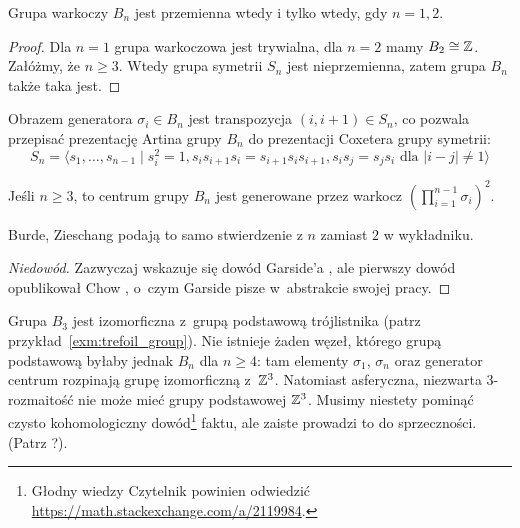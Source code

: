 \begin{proposition}
    Grupa warkoczy $B_n$ jest przemienna wtedy i tylko wtedy, gdy $n = 1, 2$.
\end{proposition}

\begin{proof}
    Dla $n = 1$ grupa warkoczowa jest trywialna, dla $n = 2$ mamy $B_2 \cong \mathbb Z$.
    Załóżmy, że $n \ge 3$. Wtedy grupa symetrii $S_n$ jest nieprzemienna, zatem grupa $B_n$ także taka jest.
\end{proof}

Obrazem generatora $\sigma_i \in B_n$ jest transpozycja $(i, i+1) \in S_n$, co pozwala przepisać prezentację Artina grupy $B_n$ do prezentacji Coxetera grupy symetrii:
%
\begin{equation}
    S_n = \langle s_1, \ldots, s_{n-1} \mid
    s_i^2 = 1,
    s_{i}s_{i+1}s_{i} = s_{i+1}s_{i}s_{i+1},
    s_is_j = s_js_i \mbox{ dla } |i-j| \neq 1 \rangle
\end{equation}

\begin{proposition}
    Jeśli $n \ge 3$, to centrum grupy $B_n$ jest generowane przez warkocz $(\prod_{i = 1}^{n-1} \sigma_i)^2$.
\end{proposition}

Burde, Zieschang \cite[s. 172]{burde2014} podają to samo stwierdzenie z $n$ zamiast $2$ w wykładniku.

\begin{proof}[Niedowód]
%
%
    Zazwyczaj wskazuje się dowód Garside'a \cite{garside1969}, ale pierwszy dowód opublikował Chow \cite{chow1948}, o~czym Garside pisze w~abstrakcie swojej pracy.
\end{proof}

Grupa $B_3$ jest izomorficzna z~grupą podstawową trójlistnika (patrz przykład~\ref{exm:trefoil_group}).
Nie istnieje żaden węzeł, którego grupą podstawową byłaby jednak $B_n$ dla $n \ge 4$: tam elementy $\sigma_1$, $\sigma_n$ oraz generator centrum rozpinają grupę izomorficzną z~$\mathbb Z^3$.
Natomiast asferyczna, niezwarta 3-rozmaitość nie może mieć grupy podstawowej $\mathbb Z^3$.
Musimy niestety pominąć czysto kohomologiczny dowód\footnote{Głodny wiedzy Czytelnik powinien odwiedzić \url{https://math.stackexchange.com/a/2119984}.} faktu, ale zaiste prowadzi to do sprzeczności.
(Patrz \cite[s. 227]{burde2014}?).









%

